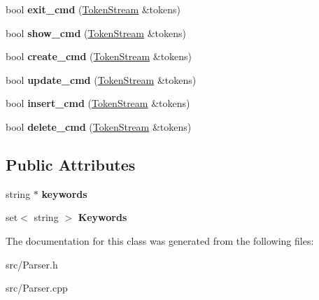 \begin{DoxyCompactItemize}
\item 
\hypertarget{class_parser_a92c41292eabec49947407e3152f1883f}{bool {\bfseries exit\-\_\-cmd} (\hyperlink{class_token_stream}{Token\-Stream} \&tokens)}\label{class_parser_a92c41292eabec49947407e3152f1883f}

\item 
\hypertarget{class_parser_a4202288d506cf2a6e99f3dfce351a152}{bool {\bfseries show\-\_\-cmd} (\hyperlink{class_token_stream}{Token\-Stream} \&tokens)}\label{class_parser_a4202288d506cf2a6e99f3dfce351a152}

\item 
\hypertarget{class_parser_aaaf5e82e4aafb6b73a593b03f82f3ade}{bool {\bfseries create\-\_\-cmd} (\hyperlink{class_token_stream}{Token\-Stream} \&tokens)}\label{class_parser_aaaf5e82e4aafb6b73a593b03f82f3ade}

\item 
\hypertarget{class_parser_aee56e9e1b7c8a2fcc4fa9cfb8e7454dc}{bool {\bfseries update\-\_\-cmd} (\hyperlink{class_token_stream}{Token\-Stream} \&tokens)}\label{class_parser_aee56e9e1b7c8a2fcc4fa9cfb8e7454dc}

\item 
\hypertarget{class_parser_af32ad4b5c4d2b09643ab1bc202c53ff4}{bool {\bfseries insert\-\_\-cmd} (\hyperlink{class_token_stream}{Token\-Stream} \&tokens)}\label{class_parser_af32ad4b5c4d2b09643ab1bc202c53ff4}

\item 
\hypertarget{class_parser_a7216e601459e66e825d8814f3f31523d}{bool {\bfseries delete\-\_\-cmd} (\hyperlink{class_token_stream}{Token\-Stream} \&tokens)}\label{class_parser_a7216e601459e66e825d8814f3f31523d}

\end{DoxyCompactItemize}
\subsection*{Public Attributes}
\begin{DoxyCompactItemize}
\item 
\hypertarget{class_parser_a306c207ca06a31321ffc5dd5dcbbea7a}{string $\ast$ {\bfseries keywords}}\label{class_parser_a306c207ca06a31321ffc5dd5dcbbea7a}

\item 
\hypertarget{class_parser_a3e3d3fc20d70443d5d8242523bea82b3}{set$<$ string $>$ {\bfseries Keywords}}\label{class_parser_a3e3d3fc20d70443d5d8242523bea82b3}

\end{DoxyCompactItemize}


The documentation for this class was generated from the following files\-:\begin{DoxyCompactItemize}
\item 
src/Parser.\-h\item 
src/Parser.\-cpp\end{DoxyCompactItemize}
